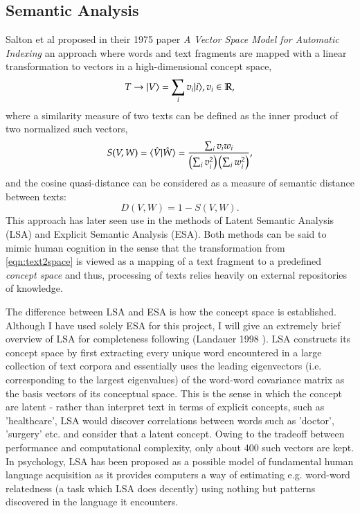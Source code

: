 \subsection{Semantic Analysis}
\label{sec:semantic_analysis}
Salton et al proposed in their 1975 paper \textit{A Vector Space Model for Automatic Indexing}\cite{Salton1975} an approach where words and text fragments are mapped with a linear transformation to vectors in a high-dimensional concept space,
\begin{equation}
	T \rightarrow | V \rangle = \sum_i v_i | i \rangle, v_i\in\mathbb{R}, \label{eqn:text2space}
\end{equation}
where a similarity measure of two texts can be defined as the inner product of two normalized such vectors,
\begin{equation}
	S(V,W) = \langle \hat{V} | \hat{W} \rangle = \frac{\sum_i v_i w_i}{\left( \sum_i v_i^2 \right)\left( \sum_iw_i^2 \right)}, \label{eqn:cosine_similarity}
\end{equation}
and the cosine quasi-distance can be considered as a measure of semantic distance between texts:
\begin{equation}
	D(V,W) = 1-S(V,W).
\end{equation}
This approach has later seen use in the methods of Latent Semantic Analysis (LSA) and Explicit Semantic Analysis (ESA). Both methods can be said to mimic human cognition in the sense that the transformation from \eqref{eqn:text2space} is viewed as a mapping of a text fragment to a predefined \textit{concept space} and thus, processing of texts relies heavily on external repositories of knowledge.

The difference between LSA and ESA is how the concept space is established. Although I have used solely ESA for this project, I will give an extremely brief overview of LSA for completeness following (Landauer 1998 \cite{Landauer1998}). LSA constructs its concept space by first extracting every unique word encountered in a large collection of text corpora and essentially uses the leading eigenvectors (i.e. corresponding to the largest eigenvalues) of the word-word covariance matrix as the basis vectors of its conceptual space. This is the sense in which the concept are latent - rather than interpret text in terms of explicit concepts, such as 'healthcare', LSA would discover correlations between words such as 'doctor', 'surgery' etc. and consider that a latent concept. Owing to the tradeoff between performance and computational complexity, only about 400 such vectors are kept\cite{Nakov2000}. In psychology, LSA has been proposed as a possible model of fundamental human language acquisition as it provides computers a way of estimating e.g. word-word relatedness (a task which LSA does decently) using nothing but patterns discovered in the language it encounters\cite{Landauer1998}.

